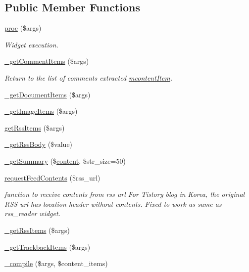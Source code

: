 \subsection*{Public Member Functions}
\begin{DoxyCompactItemize}
\item 
\hyperlink{classmcontent_abdf3692374f645c0a808db2225b9fec3}{proc} (\$args)
\begin{DoxyCompactList}\small\item\em Widget execution. \end{DoxyCompactList}\item 
\hyperlink{classmcontent_a6a077425294207e1e357668b82e30bbf}{\+\_\+get\+Comment\+Items} (\$args)
\begin{DoxyCompactList}\small\item\em Return to the list of comments extracted \hyperlink{classmcontentItem}{mcontent\+Item}. \end{DoxyCompactList}\item 
\hyperlink{classmcontent_a6a6b96bd0a1ce21aab3a350c1584554a}{\+\_\+get\+Document\+Items} (\$args)
\item 
\hyperlink{classmcontent_ac6b1900f46d6b9cbc1c1513a90a63811}{\+\_\+get\+Image\+Items} (\$args)
\item 
\hyperlink{classmcontent_a4b6b633f77c7f2280e1a0fde292b8a62}{get\+Rss\+Items} (\$args)
\item 
\hyperlink{classmcontent_a5d41447024e60278f0cf46cea902da52}{\+\_\+get\+Rss\+Body} (\$value)
\item 
\hyperlink{classmcontent_a4b4f237f52d20441108cadc2ffe0d43c}{\+\_\+get\+Summary} (\$\hyperlink{classcontent}{content}, \$str\+\_\+size=50)
\item 
\hyperlink{classmcontent_a9c74009a166bfac6a467cb27bc2ad214}{request\+Feed\+Contents} (\$rss\+\_\+url)
\begin{DoxyCompactList}\small\item\em function to receive contents from rss url For Tistory blog in Korea, the original R\+SS url has location header without contents. Fixed to work as same as rss\+\_\+reader widget. \end{DoxyCompactList}\item 
\hyperlink{classmcontent_a0fe2153c16b911c8dc3fe1184a72d378}{\+\_\+get\+Rss\+Items} (\$args)
\item 
\hyperlink{classmcontent_a8ef730735e4af7716442ae3c5d1b749a}{\+\_\+get\+Trackback\+Items} (\$args)
\item 
\hyperlink{classmcontent_ad31110bd1251e8de6256b26c279f32c9}{\+\_\+compile} (\$args, \$content\+\_\+items)
\end{DoxyCompactItemize}
